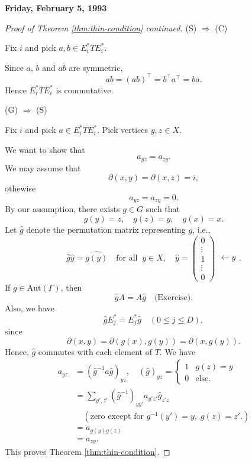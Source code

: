 \documentclass[
]{book}
\theoremstyle{definition}
\theoremstyle{definition}
\theoremstyle{definition}
\theoremstyle{definition}
\theoremstyle{remark}
\begin{document}
\textbf{Friday, February 5, 1993}

\begin{proof}[Proof of Theorem \ref{thm:thin-condition} continued]
\leavevmode

(S) \(\Rightarrow\) (C)

Fix \(i\) and pick \(a, b\in E_i^*TE_i^*\).

Since \(a\), \(b\) and \(ab\) are symmetric,
\[ab = (ab)^\top = b^\top a^\top = ba.\]
Hence \(E_i^*TE_i^*\) is commutative.

(G) \(\Rightarrow\) (S)

Fix \(i\) and pick \(a \in E_i^*TE_i^*\). Pick vertices \(y, z\in X\).

We want to show that
\[a_{yz} = a_{zy}.\]
We may assume that
\[\partial(x, y) = \partial(x,z) = i,\]
othewise
\[a_{yz} = a_{zy} = 0.\]
By our assumption, there exists \(g\in G\) such that
\[g(y) = z, \quad g(z) = y, \quad g(x) = x.\]
Let \(\hat{g}\) denote the permutation matrix representing \(g\), i.e.,
\[\hat{g}\hat{y} =\widehat{g(y)} \quad \text{for all }\ y\in X, \quad \hat{y} = \begin{pmatrix}0\\\vdots \\ 1 \\\vdots \\0\end{pmatrix}\begin{matrix} \\ \\ \leftarrow y \\ \\ \text{ } \end{matrix}.\]
If \(g\in \mathrm{Aut}(\Gamma)\), then
\[\hat{g}A = A\hat{g} \quad \text{(Exercise)}.\]
Also, we have
\[\hat{g}E_j^* = E^*_j\hat{g} \quad (0\leq j\leq D),\]
since
\[\partial(x,y) = \partial(g(x), g(y)) = \partial(x, g(y)).\]
Hence, \(\hat{g}\) commutes with each element of \(T\). We have
\begin{align}
a_{yz} & = (\hat{g}^{-1}a\hat{g})_{yz}, \quad (\hat{g})_{yz} = \begin{cases} 1 & g(z) = y\\ 0 & \text{else.}\end{cases}\\
& = \sum_{y', z'}(\hat{g}^{-1})_{yy'}a_{y'z'}\hat{g}_{z'z}\\
& \quad (\text{zero except for $g^{-1}(y') = y, \; g(z) = z'$}.)\\
& = a_{g(y)g(z)}\\
& = a_{zy}.
\end{align}
This proves Theorem \ref{thm:thin-condition}.

\end{proof}
\end{document}

